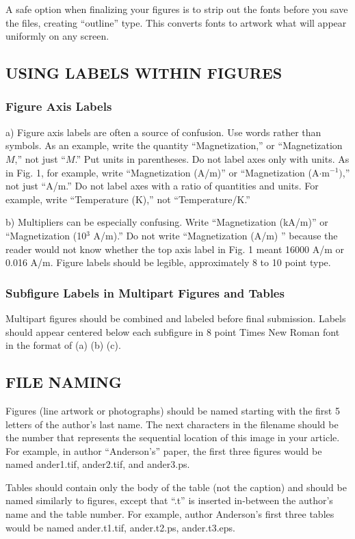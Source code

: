 \documentclass{ieeetmlcn}
\begin{document}
A safe option when finalizing your figures is to strip out the fonts before
you save the files, creating ``outline'' type. This converts fonts to
artwork what will appear uniformly on any screen.

\subsection{USING LABELS WITHIN FIGURES}
\subsubsection{Figure Axis Labels}
a) Figure axis labels are often a source of confusion. Use words rather than
symbols. As an example, write the quantity ``Magnetization,'' or
``Magnetization $M$,'' not just ``$M$.'' Put units in parentheses. Do not label
axes only with units. As in Fig. 1, for example, write ``Magnetization
(A/m)'' or ``Magnetization (A$\cdot $m$^{-1})$,'' not just ``A/m.'' Do not
label axes with a ratio of quantities and units. For example, write
``Temperature (K),'' not ``Temperature/K.''

b) Multipliers can be especially confusing. Write ``Magnetization (kA/m)'' or
``Magnetization (10$^{3}$ A/m).'' Do not write ``Magnetization (A/m)
'' because the reader would not know whether the top axis
label in Fig. 1 meant 16000 A/m or 0.016 A/m. Figure labels should be
legible, approximately 8 to 10 point type.

\subsubsection{Subfigure Labels in Multipart Figures and Tables}
Multipart figures should be combined and labeled before final submission.
Labels should appear centered below each subfigure in 8 point Times New
Roman font in the format of (a) (b) (c).

\subsection{FILE NAMING}
Figures (line artwork or photographs) should be named starting with the
first 5 letters of the author's last name. The next characters in the
filename should be the number that represents the sequential location of
this image in your article. For example, in author ``Anderson's'' paper, the
first three figures would be named ander1.tif, ander2.tif, and ander3.ps.

Tables should contain only the body of the table (not the caption) and
should be named similarly to figures, except that ``.t'' is inserted
in-between the author's name and the table number. For example, author
Anderson's first three tables would be named ander.t1.tif, ander.t2.ps,
ander.t3.eps.
\end{document}
